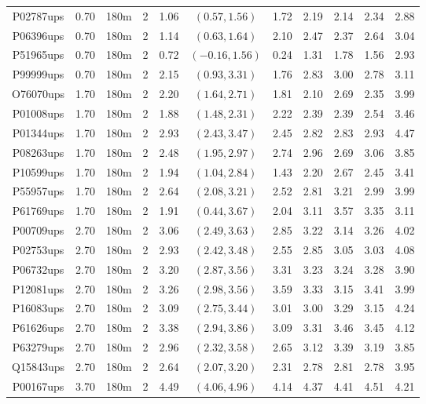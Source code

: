 \begin{landscape}
\begin{longtable}{cccc|cc|ccccc}
  P02787ups & 0.70 & 180m &   2 & 1.06 & $(0.57, 1.56)$ & 1.72 & 2.19 & 2.14 & 2.34 & 2.88 \\ 
  P06396ups & 0.70 & 180m &   2 & 1.14 & $(0.63, 1.64)$ & 2.10 & 2.47 & 2.37 & 2.64 & 3.04 \\ 
  P51965ups & 0.70 & 180m &   2 & 0.72 & $(-0.16, 1.56)$ & 0.24 & 1.31 & 1.78 & 1.56 & 2.93 \\ 
  P99999ups & 0.70 & 180m &   2 & 2.15 & $(0.93, 3.31)$ & 1.76 & 2.83 & 3.00 & 2.78 & 3.11 \\ 
  O76070ups & 1.70 & 180m &   2 & 2.20 & $(1.64, 2.71)$ & 1.81 & 2.10 & 2.69 & 2.35 & 3.99 \\ 
  P01008ups & 1.70 & 180m &   2 & 1.88 & $(1.48, 2.31)$ & 2.22 & 2.39 & 2.39 & 2.54 & 3.46 \\ 
  P01344ups & 1.70 & 180m &   2 & 2.93 & $(2.43, 3.47)$ & 2.45 & 2.82 & 2.83 & 2.93 & 4.47 \\ 
  P08263ups & 1.70 & 180m &   2 & 2.48 & $(1.95, 2.97)$ & 2.74 & 2.96 & 2.69 & 3.06 & 3.85 \\ 
  P10599ups & 1.70 & 180m &   2 & 1.94 & $(1.04, 2.84)$ & 1.43 & 2.20 & 2.67 & 2.45 & 3.41 \\ 
  P55957ups & 1.70 & 180m &   2 & 2.64 & $(2.08, 3.21)$ & 2.52 & 2.81 & 3.21 & 2.99 & 3.99 \\ 
  P61769ups & 1.70 & 180m &   2 & 1.91 & $(0.44, 3.67)$ & 2.04 & 3.11 & 3.57 & 3.35 & 3.11 \\ 
  P00709ups & 2.70 & 180m &   2 & 3.06 & $(2.49, 3.63)$ & 2.85 & 3.22 & 3.14 & 3.26 & 4.02 \\ 
  P02753ups & 2.70 & 180m &   2 & 2.93 & $(2.42, 3.48)$ & 2.55 & 2.85 & 3.05 & 3.03 & 4.08 \\ 
  P06732ups & 2.70 & 180m &   2 & 3.20 & $(2.87, 3.56)$ & 3.31 & 3.23 & 3.24 & 3.28 & 3.90 \\ 
  P12081ups & 2.70 & 180m &   2 & 3.26 & $(2.98, 3.56)$ & 3.59 & 3.33 & 3.15 & 3.41 & 3.99 \\ 
  P16083ups & 2.70 & 180m &   2 & 3.09 & $(2.75, 3.44)$ & 3.01 & 3.00 & 3.29 & 3.15 & 4.24 \\ 
  P61626ups & 2.70 & 180m &   2 & 3.38 & $(2.94, 3.86)$ & 3.09 & 3.31 & 3.46 & 3.45 & 4.12 \\ 
  P63279ups & 2.70 & 180m &   2 & 2.96 & $(2.32, 3.58)$ & 2.65 & 3.12 & 3.39 & 3.19 & 3.85 \\ 
  Q15843ups & 2.70 & 180m &   2 & 2.64 & $(2.07, 3.20)$ & 2.31 & 2.78 & 2.81 & 2.78 & 3.95 \\ 
  P00167ups & 3.70 & 180m &   2 & 4.49 & $(4.06, 4.96)$ & 4.14 & 4.37 & 4.41 & 4.51 & 4.21 \\ 

\end{longtable}
\end{landscape}
